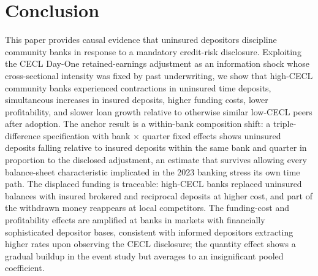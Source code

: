 
\section{Conclusion}
\label{sec:conclusion}

This paper provides causal evidence that uninsured depositors discipline community
banks in response to a mandatory credit-risk disclosure.  Exploiting the
CECL Day-One retained-earnings adjustment as an information
shock whose cross-sectional intensity was fixed by past underwriting, we show
that high-CECL community banks experienced contractions
in uninsured time deposits, simultaneous increases in insured deposits, higher
funding costs, lower profitability, and slower loan growth relative to
otherwise similar low-CECL
peers after adoption.  The anchor result is a within-bank composition shift: a
triple-difference specification with bank
$\times$ quarter fixed effects shows uninsured deposits falling relative to
insured deposits within the same bank and quarter in proportion to the
disclosed adjustment, an estimate that survives allowing every balance-sheet
characteristic implicated in the 2023 banking stress its own time path.  The
displaced funding is traceable: high-CECL banks replaced uninsured balances
with insured brokered and reciprocal deposits at higher cost, and part of the
withdrawn money reappears at local competitors.  The funding-cost and
profitability effects are amplified at banks in markets with financially
sophisticated depositor bases, consistent with informed depositors extracting
higher rates upon observing the CECL disclosure; the quantity effect shows a
gradual buildup in the event study but averages to an insignificant pooled
coefficient.

